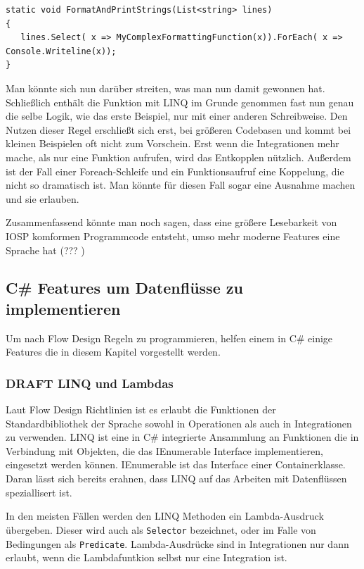 \documentclass[11pt]{article}
\begin{document}
\begin{verbatim}
static void FormatAndPrintStrings(List<string> lines)
{
   lines.Select( x => MyComplexFormattingFunction(x)).ForEach( x => Console.Writeline(x));
}
\end{verbatim}
Man könnte sich nun darüber streiten, was man nun damit gewonnen hat. Schließlich enthält die Funktion mit LINQ im Grunde
genommen fast nun genau die selbe Logik, wie das erste Beispiel, nur mit einer anderen Schreibweise.
Den Nutzen dieser Regel erschließt sich erst, bei größeren Codebasen und kommt bei kleinen Beispielen oft nicht zum Vorschein.
Erst wenn die Integrationen mehr mache, als nur eine Funktion aufrufen, wird das Entkopplen nützlich.
Außerdem ist der Fall einer Foreach-Schleife und ein Funktionsaufruf eine Koppelung, die nicht so dramatisch ist. Man
könnte für diesen Fall sogar eine Ausnahme machen und sie erlauben.


Zusammenfassend könnte man noch sagen, dass eine größere Lesebarkeit von IOSP komformen Programmcode entsteht, umso mehr moderne
Features eine Sprache hat (??? )
\subsection{C\# Features um Datenflüsse zu implementieren}
\label{sec:orgheadline54}
Um nach Flow Design Regeln zu programmieren, helfen einem in C\# einige Features die in diesem Kapitel vorgestellt werden.

\subsubsection{{\bfseries\sffamily DRAFT} LINQ und Lambdas}
\label{sec:orgheadline50}
Laut Flow Design Richtlinien ist es erlaubt die Funktionen der
Standardbibliothek der Sprache sowohl in Operationen als auch in Integrationen
zu verwenden. LINQ ist eine in C\# integrierte Ansammlung an Funktionen die in Verbindung mit
Objekten, die das IEnumerable Interface implementieren, eingesetzt werden
können.
IEnumerable ist das Interface einer Containerklasse. Daran lässt sich bereits erahnen, dass LINQ
auf das Arbeiten mit Datenflüssen speziallisert ist.

In den meisten Fällen werden den LINQ Methoden ein Lambda-Ausdruck übergeben. 
Dieser wird auch als \texttt{Selector} bezeichnet, oder im Falle von Bedingungen als \texttt{Predicate}.
Lambda-Ausdrücke sind in Integrationen nur dann erlaubt, wenn die Lambdafuntkion
selbst nur eine Integration ist.
\end{document}
